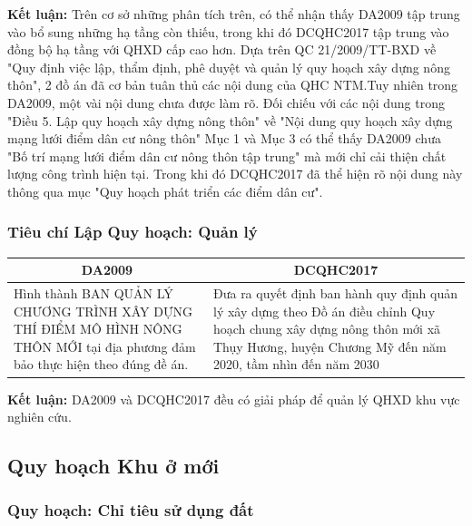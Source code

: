 \documentclass[../thesis.tex]{subfiles}
\begin{document}
\textbf{Kết luận:} Trên cơ sở những phân tích trên, có thể nhận thấy DA2009 tập trung vào bổ sung những hạ tầng còn thiếu, trong khi đó DCQHC2017 tập trung vào đồng bộ hạ tầng với QHXD cấp cao hơn. Dựa trên QC 21/2009/TT-BXD về "Quy định việc lập, thẩm định, phê duyệt và quản lý
quy hoạch xây dựng nông thôn", 2 đồ án đã cơ bản tuân thủ các nội dung của QHC NTM.Tuy nhiên trong DA2009, một vài nội dung chưa được làm rõ. Đối chiếu với các nội dung trong "Điều 5. Lập quy hoạch xây dựng nông thôn" về "Nội dung quy hoạch xây dựng mạng lưới điểm dân cư nông thôn" Mục 1 và Mục 3 có thể thấy DA2009 chưa "Bố trí mạng lưới điểm dân cư nông thôn tập trung" mà mới chỉ cải thiện chất lượng công trình hiện tại. Trong khi đó DCQHC2017 đã thể hiện rõ nội dung này thông qua mục "Quy hoạch phát triển các điểm dân cư".\\
\subsubsection {Tiêu chí Lập Quy hoạch: Quản lý}

\begin{table}[h!]
\centering
\begin{tabular}{ | m{7.5cm} | m{7.5cm}| } 
\hline      
\multicolumn{1}{|c|}{\textbf{DA2009}}& \multicolumn{1}{c|}{\textbf{DCQHC2017}} \\
\hline  
Hình thành BAN QUẢN LÝ CHƯƠNG TRÌNH XÂY DỰNG THÍ ĐIỂM MÔ HÌNH NÔNG THÔN MỚI tại địa phương đảm bảo thực hiện theo đúng đề án. &Đưa ra quyết định ban hành quy định quản lý xây dựng theo Đồ án điều chỉnh Quy hoạch chung xây dựng nông thôn mới xã Thụy Hương, huyện Chương Mỹ đến năm 2020, tầm nhìn đến năm 2030 \\
\hline 
\end{tabular}
\end{table}

\textbf{Kết luận:} DA2009 và DCQHC2017 đều có giải pháp để quản lý QHXD khu vực nghiên cứu.
\clearpage

\subsection {Quy hoạch Khu ở mới}
\subsubsection{Quy hoạch: Chỉ tiêu sử dụng đất}
\end{document}
